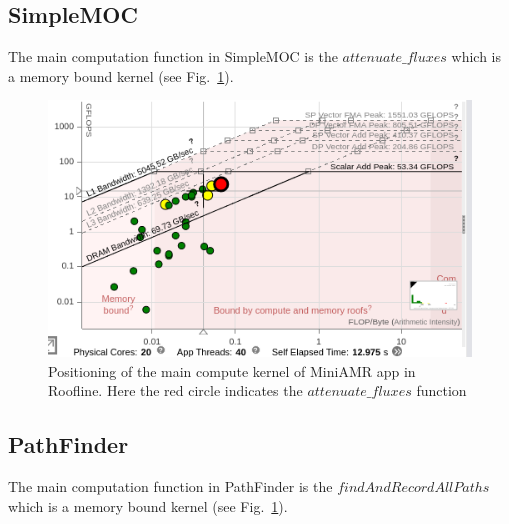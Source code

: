 \subsection{SimpleMOC}
The main computation function in SimpleMOC is the $attenuate\_fluxes$  which is a memory bound kernel (see Fig.~\ref{fig:roof-simplemoc}). 

\begin{figure}[h]%
\begin{center}
\includegraphics[width=1\linewidth]{MEMSYS22/figures/roofline/simplesoc.png}
\end{center}
  \vspace{-0.1in}
\caption{Positioning of the main compute kernel of MiniAMR app in Roofline. Here the red circle indicates the $attenuate\_fluxes$ function }
\label{fig:roof-simplemoc}
\vspace{-0.2in}
\end{figure}

\subsection{PathFinder}
The main computation function in PathFinder is the $findAndRecordAllPaths$  which is a memory bound kernel (see Fig.~\ref{fig:roof-simplemoc}). 

